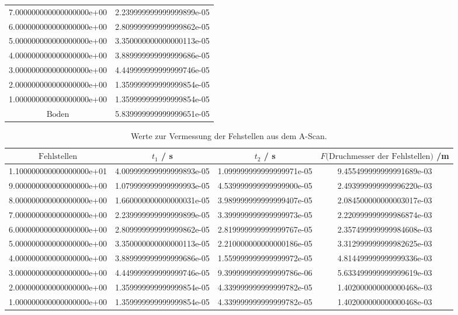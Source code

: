 \begin{table}
{\begin{tabular}{S[scientific-notation= fixed, fixed-exponent = 0, round-precision = 0] S}
    7.000000000000000000e+00 & 2.239999999999999899e-05\\
    6.000000000000000000e+00 & 2.809999999999999862e-05\\
    5.000000000000000000e+00 & 3.350000000000000113e-05\\
    4.000000000000000000e+00 & 3.889999999999999686e-05\\
    3.000000000000000000e+00 & 4.449999999999999746e-05\\
    2.000000000000000000e+00 & 1.359999999999999854e-05\\
    1.000000000000000000e+00 & 1.359999999999999854e-05\\
    $\text{Boden}$ & 5.839999999999999651e-05\\
    \bottomrule
  \end{tabular}
  \label{tab:ABB}
}
\end{table}
\begin{table}
  \centering
  \caption{Werte zur Vermessung der Fehstellen aus dem A-Scan.}
  \begin{tabular}{S[scientific-notation = fixed , fixed-exponent = 0, round-precision=0] S S S}
    \toprule
    $ \text{Fehlstellen} $& $ t_{1} $ / \si{\second}&  $ t_{2} $ / \si{\second} & $F \text{(Druchmesser der Fehlstellen)}$ /\si{\meter} \\
    \midrule
    1.100000000000000000e+01 & 4.009999999999999893e-05 & 1.099999999999999971e-05 & 9.455499999999991689e-03\\
    9.000000000000000000e+00 & 1.079999999999999993e-05 & 4.539999999999999900e-05 & 2.493999999999996220e-03\\
    8.000000000000000000e+00 & 1.660000000000000031e-05 & 3.989999999999999407e-05 & 2.084500000000003017e-03\\
    7.000000000000000000e+00 & 2.239999999999999899e-05 & 3.399999999999999973e-05 & 2.220999999999986874e-03\\
    6.000000000000000000e+00 & 2.809999999999999862e-05 & 2.819999999999999767e-05 & 2.357499999999984608e-03\\
    5.000000000000000000e+00 & 3.350000000000000113e-05 & 2.210000000000000186e-05 & 3.312999999999982625e-03\\
    4.000000000000000000e+00 & 3.889999999999999686e-05 & 1.559999999999999972e-05 & 4.814499999999999336e-03\\
    3.000000000000000000e+00 & 4.449999999999999746e-05 & 9.399999999999999786e-06 & 5.633499999999999619e-03\\
    2.000000000000000000e+00 & 1.359999999999999854e-05 & 4.339999999999999782e-05 & 1.402000000000000468e-03\\
    1.000000000000000000e+00 & 1.359999999999999854e-05 & 4.339999999999999782e-05 & 1.402000000000000468e-03\\
    \bottomrule
  \end{tabular}
  \label{tab:F1}
\end{table}
